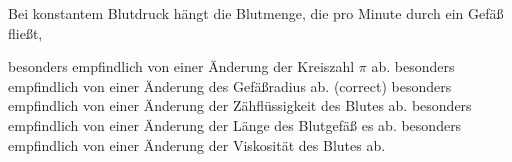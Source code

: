 \documentclass[11pt]{exam}
\begin{document}
\begin{questions}
\vspace{3mm}\question Bei konstantem Blutdruck hängt die Blutmenge, die pro Minute durch ein Gefäß fließt,

\begin{choices}
	\choice besonders empfindlich von einer Änderung der Kreiszahl \(\pi\) ab.
	\choice besonders empfindlich von einer Änderung des Gefäßradius ab. (correct)
	\choice besonders empfindlich von einer Änderung der Zähflüssigkeit des Blutes ab.
	\choice besonders empfindlich von einer Änderung der Länge des Blutgefäß es ab.
	\choice besonders empfindlich von einer Änderung der Viskosität des Blutes ab.
\end{choices}

\vspace{3mm}\end{questions}
\end{document}

